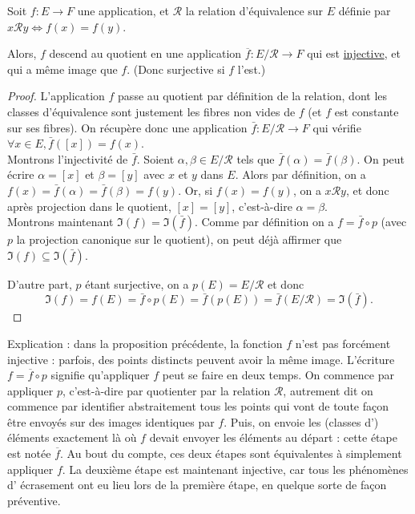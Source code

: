 \begin{proposition}
Soit $f : E\to F$ une application, et $\mathcal R$ la relation d'équivalence sur $E$ définie par $x\mathcal R y \iff f(x)=f(y)$.

Alors, $f$ descend au quotient en une application $\overline f : E/\mathcal R \to F$ qui est \underline{injective}, et qui a même image que $f$. (Donc surjective si $f$ l'est.)
\end{proposition}

\begin{proof}
L'application $f$ passe au quotient par définition de la relation, dont les classes d'équivalence sont justement les fibres non vides de $f$ (et $f$ est constante sur ses fibres). On récupère donc une application $\bar f : E/\mathcal R \to F$ qui vérifie $\forall x\in E, \bar f([x])=f(x)$.\\

Montrons l'injectivité de $\bar f$. Soient $\alpha, \beta \in E/\mathcal R$ tels que $\bar f(\alpha)=\bar f(\beta)$. On peut écrire $\alpha=[x]$ et $\beta=[y]$ avec $x$ et $y$ dans $E$. Alors par définition, on a $f(x)=\bar f(\alpha) = \bar f(\beta)=f(y)$. Or, si $f(x)=f(y)$, on a $x\mathcal R y$, et donc après projection dans le quotient, $[x]=[y]$, c'est-à-dire $\boxed{\alpha=\beta}$.\\

Montrons maintenant $\Im(f)=\Im(\bar f)$. Comme par définition on a $f = \bar f \circ p$ (avec $p$ la projection canonique sur le quotient), on peut déjà affirmer que $\Im(f)\subseteq\Im(\bar f)$.

D'autre part, $p$ étant surjective, on a $p(E)=E/\mathcal R$ et donc 
\[\Im(f) = f(E)=\bar f \circ p (E) = \bar f(p(E)) = \bar f(E/\mathcal R) = \Im(\bar f).\]
\end{proof}

\begin{mdframed}[linewidth=2]
Explication : dans la proposition précédente, la fonction $f$ n'est pas forcément injective : parfois, des points distincts peuvent avoir la même image. L'écriture $f = \overline f \circ p$ signifie qu'appliquer $f$ peut se faire en deux temps. On commence par appliquer $p$, c'est-à-dire par quotienter par la relation $\mathcal R$, autrement dit on commence par identifier abstraitement tous les points qui vont de toute façon être envoyés sur des images identiques par $f$. Puis, on envoie les (classes d') éléments exactement là où $f$ devait envoyer les éléments au départ : cette étape est notée $\overline f$. Au bout du compte, ces deux étapes sont équivalentes à simplement appliquer $f$. La deuxième étape est maintenant injective, car tous les phénomènes \og d' écrasement\fg{} ont eu lieu lors de la première étape, en quelque sorte de façon \og préventive\fg{}.
\end{mdframed}

